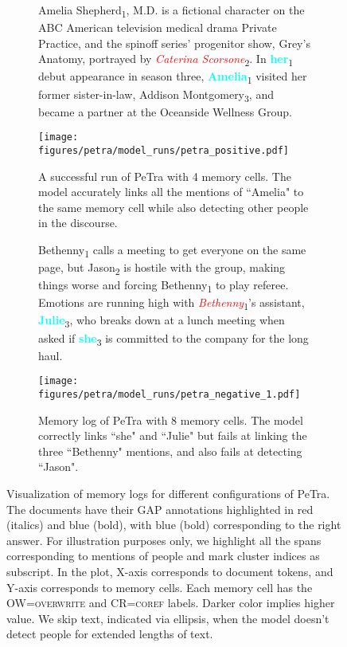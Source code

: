 \documentclass[12pt]{thesis-umich}[thesis]
\newcommand{\hlent}[2]{\colorbox{gray!20}{#1\textsubscript{#2}}}
\newcommand{\actcoref}{\textsc{coref}\xspace}
\newcommand{\actoverwrite}{\textsc{overwrite}\xspace}
\begin{document}
\begin{figure*}[!ht]
    \centering

    \begin{subfigure}[t]{\textwidth}
    \begin{mdframed}
        \footnotesize{
        \hlent{Amelia Shepherd}{1}, M.D. is a fictional character on the ABC American television medical drama Private Practice, and the spinoff series' progenitor show, Grey's Anatomy, portrayed by \hlent{\textcolor{red}{\it Caterina Scorsone}}{2}. In \hlent{\textcolor{aqua}{\bf her}}{1} debut appearance in season three, \hlent{\textcolor{aqua}{\bf Amelia}}{1} visited her former sister-in-law, \hlent{Addison Montgomery}{3}, and became a partner at the Oceanside Wellness Group.
        }
    \end{mdframed}
    \end{subfigure}
    \begin{subfigure}[t]{\textwidth}
    \texttt{[image: figures/petra/model\_runs/petra\_positive.pdf]}
    \caption{A successful run of PeTra with 4 memory cells. The model accurately links all the mentions of ``Amelia" to the same memory cell while also detecting other people in the discourse.}
    \label{fig:success}
    \end{subfigure}
    \begin{subfigure}[t]{\textwidth}
    \begin{mdframed}
        \footnotesize{
        \hlent{Bethenny}{1} calls a meeting to get everyone on the same page, but \hlent{Jason}{2} is hostile with the group, making things worse and forcing \hlent{Bethenny}{1} to play referee. Emotions are running high with \hlent{\textcolor{red}{\it Bethenny}}{1}'s assistant, \hlent{\textcolor{aqua}{\bf Julie}}{3}, who breaks down at a lunch meeting when asked if \hlent{\textcolor{aqua}{\bf she}}{3} is committed to the company for the long haul.
        }
    \end{mdframed}
    \end{subfigure}
    \begin{subfigure}[t]{\textwidth}
    \texttt{[image: figures/petra/model\_runs/petra\_negative\_1.pdf]}
    \caption{Memory log of PeTra with 8 memory cells. The model correctly links ``she" and ``Julie" but fails at linking the three ``Bethenny" mentions, and also fails at detecting ``Jason".}
    \label{fig:failure}
    \end{subfigure}
    \caption{Visualization of memory logs for different configurations of PeTra.
    The documents have their GAP annotations highlighted in red (italics) and blue (bold), with blue (bold) corresponding to the right answer. For illustration purposes only, we highlight all the spans corresponding to mentions of people and mark cluster indices as subscript.
    In the plot, X-axis corresponds to document tokens, and Y-axis corresponds to memory cells. Each memory cell has the OW=\actoverwrite and CR=\actcoref labels. Darker color implies higher value.
    We skip text, indicated via ellipsis, when the model doesn't detect people for extended lengths of text.}
    \label{fig:visualize}
\end{figure*} 
\end{document}
